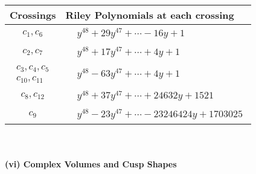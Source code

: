 \documentclass[1p]{elsarticle_modified}
\theoremstyle{definition}
\begin{document}
\begin{tabular}{m{50pt}|m{274pt}}
Crossings & \hspace{64pt}Riley Polynomials at each crossing \\
\hline $$\begin{aligned}c_{1},c_{6}\end{aligned}$$&$\begin{aligned}
&y^{48}+29 y^{47}+\cdots-16 y+1
\end{aligned}$\\
\hline $$\begin{aligned}c_{2},c_{7}\end{aligned}$$&$\begin{aligned}
&y^{48}+17 y^{47}+\cdots+4 y+1
\end{aligned}$\\
\hline $$\begin{aligned}c_{3},c_{4},c_{5}\\c_{10},c_{11}\end{aligned}$$&$\begin{aligned}
&y^{48}-63 y^{47}+\cdots+4 y+1
\end{aligned}$\\
\hline $$\begin{aligned}c_{8},c_{12}\end{aligned}$$&$\begin{aligned}
&y^{48}+37 y^{47}+\cdots+24632 y+1521
\end{aligned}$\\
\hline $$\begin{aligned}c_{9}\end{aligned}$$&$\begin{aligned}
&y^{48}-23 y^{47}+\cdots-23246424 y+1703025
\end{aligned}$\\
\hline
\end{tabular}\\~\\
\newpage\flushleft \textbf{(vi) Complex Volumes and Cusp Shapes}
\end{document}
